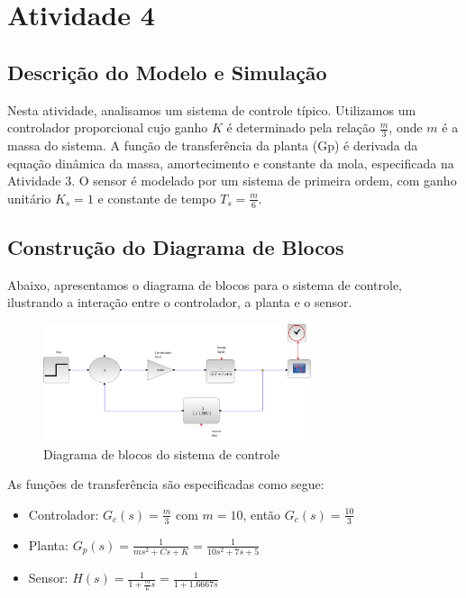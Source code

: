 \section{Atividade 4}

\subsection{Descrição do Modelo e Simulação}
Nesta atividade, analisamos um sistema de controle típico. Utilizamos um controlador proporcional cujo ganho \( K \) é determinado pela relação \( \frac{m}{3} \), onde \( m \) é a massa do sistema. A função de transferência da planta (Gp) é derivada da equação dinâmica da massa, amortecimento e constante da mola, especificada na Atividade 3. O sensor é modelado por um sistema de primeira ordem, com ganho unitário \( K_s = 1 \) e constante de tempo \( T_s = \frac{m}{6} \).

\subsection{Construção do Diagrama de Blocos}
Abaixo, apresentamos o diagrama de blocos para o sistema de controle, ilustrando a interação entre o controlador, a planta e o sensor.

\begin{figure}[H]
    \centering
    \includegraphics[width=0.7\textwidth]{4-atividade/assets/diagrama-blocos.png}
    \caption{Diagrama de blocos do sistema de controle}
    \label{fig:diagrama_blocos}
\end{figure}

As funções de transferência são especificadas como segue:
\begin{itemize}
    \item Controlador: \( G_c(s) = \frac{m}{3} \) com \( m = 10 \), então \( G_c(s) = \frac{10}{3} \)
    \item Planta: \( G_p(s) = \frac{1}{m s^2 + C s + K} = \frac{1}{10 s^2 + 7 s + 5} \)
    \item Sensor: \( H(s) = \frac{1}{1 + \frac{m}{6} s} = \frac{1}{1 + 1.6667 s} \)
\end{itemize}

